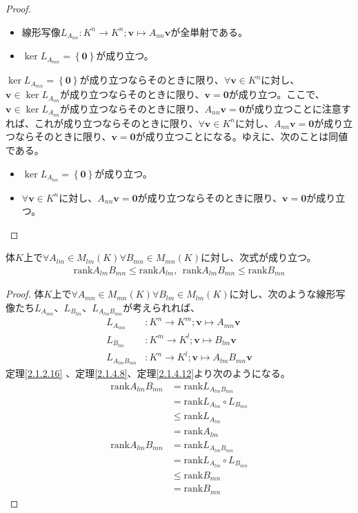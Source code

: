 \documentclass[dvipdfmx]{jsarticle}
\begin{document}
\begin{proof}
\begin{itemize}
\item
  線形写像$L_{A_{nn}}:K^{n} \rightarrow K^{n};\mathbf{v} \mapsto A_{nn}\mathbf{v}$が全単射である。
\item
  $\ker L_{A_{mn}} = \left\{ \mathbf{0} \right\}$が成り立つ。
\end{itemize}\par
$\ker L_{A_{mn}} = \left\{ \mathbf{0} \right\}$が成り立つならそのときに限り、$\forall\mathbf{v} \in K^{n}$に対し、$\mathbf{v} \in \ker L_{A_{nn}}$が成り立つならそのときに限り、$\mathbf{v} = \mathbf{0}$が成り立つ。ここで、$\mathbf{v} \in \ker L_{A_{nn}}$が成り立つならそのときに限り、$A_{nn}\mathbf{v} = \mathbf{0}$が成り立つことに注意すれば、これが成り立つならそのときに限り、$\forall\mathbf{v} \in K^{n}$に対し、$A_{nn}\mathbf{v} = \mathbf{0}$が成り立つならそのときに限り、$\mathbf{v} = \mathbf{0}$が成り立つことになる。ゆえに、次のことは同値である。
\begin{itemize}
\item
  $\ker L_{A_{nn}} = \left\{ \mathbf{0} \right\}$が成り立つ。
\item
  $\forall\mathbf{v} \in K^{n}$に対し、$A_{nn}\mathbf{v} = \mathbf{0}$が成り立つならそのときに限り、$\mathbf{v} = \mathbf{0}$が成り立つ。
\end{itemize}
\end{proof}
\begin{thm}\label{2.1.4.15}
体$K$上で$\forall A_{lm} \in M_{lm}(K)\forall B_{mn} \in M_{mn}(K)$に対し、次式が成り立つ。
\begin{align*}
{\mathrm{rank} }{A_{lm}B_{mn}} \leq {\mathrm{rank} }A_{lm},\ \ {\mathrm{rank} }{A_{lm}B_{mn}} \leq {\mathrm{rank} }B_{mn}
\end{align*}
\end{thm}
\begin{proof}
体$K$上で$\forall A_{mn} \in M_{mn}(K)\forall B_{lm} \in M_{lm}(K)$に対し、次のような線形写像たち$L_{A_{mn}}$、$L_{B_{lm}}$、$L_{A_{lm}B_{mn}}$が考えられれば、
\begin{align*}
L_{A_{mn}}&:K^{n} \rightarrow K^{m};\mathbf{v} \mapsto A_{mn}\mathbf{v}\\
L_{B_{lm}}&:K^{m} \rightarrow K^{l};\mathbf{v} \mapsto B_{lm}\mathbf{v}\\
L_{A_{lm}B_{mn}}&:K^{n} \rightarrow K^{l};\mathbf{v} \mapsto A_{lm}B_{mn}\mathbf{v}
\end{align*}
定理\ref{2.1.2.16} 、定理\ref{2.1.4.8}、定理\ref{2.1.4.12}より次のようになる。
\begin{align*}
{\mathrm{rank} }{A_{lm}B_{mn}} &= {\mathrm{rank} }L_{A_{lm}B_{mn}}\\
&= {\mathrm{rank} }{L_{A_{lm}} \circ L_{B_{mn}}}\\
&\leq {\mathrm{rank} }L_{A_{lm}}\\
&= {\mathrm{rank} }A_{lm}\\
{\mathrm{rank} }{A_{lm}B_{mn}} &= {\mathrm{rank} }L_{A_{lm}B_{mn}}\\
&= {\mathrm{rank} }{L_{A_{lm}} \circ L_{B_{mn}}}\\
&\leq {\mathrm{rank} }B_{mn}\\
&= {\mathrm{rank} }B_{mn}
\end{align*}
\end{proof}
\end{document}
